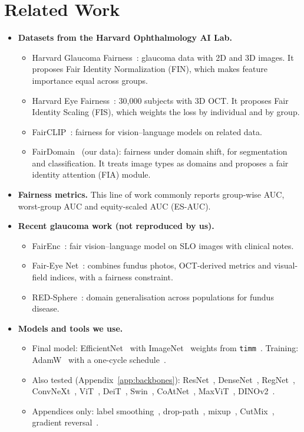 \documentclass[11pt]{article}
\begin{document}
\section{Related Work}
\begin{itemize}
\item \textbf{Datasets from the Harvard Ophthalmology AI Lab.}
  \begin{itemize}
  \item Harvard Glaucoma Fairness~\cite{harvardgf}: glaucoma data with 2D and 3D images. It proposes Fair Identity Normalization (FIN), which makes feature importance equal across groups.
  \item Harvard Eye Fairness~\cite{harvardeye}: 30{,}000 subjects with 3D OCT. It proposes Fair Identity Scaling (FIS), which weights the loss by individual and by group.
  \item FairCLIP~\cite{fairclip}: fairness for vision--language models on related data.
  \item FairDomain~\cite{fairdomain} (our data): fairness under domain shift, for segmentation and classification. It treats image types as domains and proposes a fair identity attention (FIA) module.
  \end{itemize}
\item \textbf{Fairness metrics.} This line of work commonly reports group-wise AUC, worst-group AUC and equity-scaled AUC (ES-AUC).
\item \textbf{Recent glaucoma work (not reproduced by us).}
  \begin{itemize}
  \item FairEnc~\cite{fairenc}: fair vision--language model on SLO images with clinical notes.
  \item Fair-Eye Net~\cite{faireyenet}: combines fundus photos, OCT-derived metrics and visual-field indices, with a fairness constraint.
  \item RED-Sphere~\cite{redsphere}: domain generalisation across populations for fundus disease.
  \end{itemize}
\item \textbf{Models and tools we use.}
  \begin{itemize}
  \item Final model: EfficientNet~\cite{efficientnet} with ImageNet~\cite{imagenet} weights from \texttt{timm}~\cite{timm}. Training: AdamW~\cite{adamw} with a one-cycle schedule~\cite{onecycle}.
  \item Also tested (Appendix~\ref{app:backbones}): ResNet~\cite{resnet}, DenseNet~\cite{densenet}, RegNet~\cite{regnet}, ConvNeXt~\cite{convnext}, ViT~\cite{vit}, DeiT~\cite{deit}, Swin~\cite{swin}, CoAtNet~\cite{coatnet}, MaxViT~\cite{maxvit}, DINOv2~\cite{dinov2}.
  \item Appendices only: label smoothing~\cite{labelsmooth}, drop-path~\cite{stochdepth}, mixup~\cite{mixup}, CutMix~\cite{cutmix}, gradient reversal~\cite{grl}.
  \end{itemize}
\end{itemize}
\end{document}
